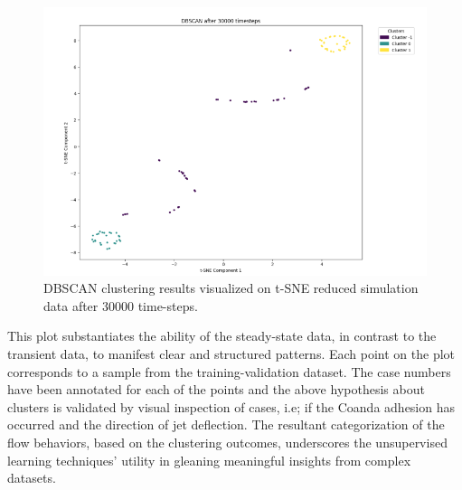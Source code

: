 \begin{figure}[ht]
\centering
\includegraphics[width=15cm]{images/Clustering/cluster1.png}
\caption{DBSCAN clustering results visualized on t-SNE reduced simulation data after 30000 time-steps.}
\label{fig:dbscan_results}
\end{figure}

This plot substantiates the ability of the steady-state data, in contrast to the transient data, to manifest clear and structured patterns. Each point on the plot corresponds to a sample from the training-validation dataset. The case numbers have been annotated for each of the points and the above hypothesis about clusters is validated by visual inspection of cases, i.e; if the Coanda adhesion has occurred and the direction of jet deflection. The resultant categorization of the flow behaviors, based on the clustering outcomes, underscores the unsupervised learning techniques' utility in gleaning meaningful insights from complex datasets. \\

